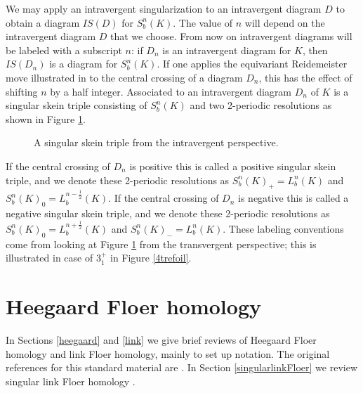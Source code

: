 \documentclass[11pt]{amsart}
\theoremstyle{definition}
\theoremstyle{remark}
\numberwithin{equation}{section}
\begin{document}
We may apply an intravergent singularization to an intravergent diagram $D$ to obtain a diagram $IS(D)$ for $S_b^n(K)$. The value of $n$ will depend on the intravergent diagram $D$ that we choose. From now on intravergent diagrams will be labeled with a subscript $n$: if $D_n$ is an intravergent diagram for $K$, then $IS(D_n)$ is a diagram for $S^n_b(K)$. If one applies the equivariant Reidemeister move illustrated in \cite[~Figure 4.1]{KhSI} to the central crossing of a  diagram $D_n$, this has the effect of shifting $n$ by a half integer.
Associated to an intravergent diagram $D_n$ of $K$ is a singular skein triple consisting of $S^n_b(K)$ and two 2-periodic resolutions as shown in Figure \ref{fig:singskeintripintra}. 
\begin{figure}[htb!]
\center
{}
\caption{A singular skein triple from the intravergent perspective.}\label{fig:singskeintripintra}\end{figure}
If the central crossing of $D_n$ is positive this is called a positive singular skein triple, and we denote these 2-periodic resolutions as $S_b^n(K)_+=L_b^n(K)$ and $S_b^n(K)_0=L_b^{n-\frac{1}{2}}(K)$.
If the central crossing of $D_n$ is negative this is called a negative singular skein triple, and we denote these 2-periodic resolutions as $S_b^n(K)_0=L_b^{n+\frac{1}{2}}(K)$ and $S_b^n(K)_-=L_b^n(K)$. These labeling conventions come from looking at Figure \ref{fig:singskeintripintra} from the transvergent perspective; this is illustrated in case of $3_1^+$ in Figure \ref{4trefoil}.\nopagebreak\section{Heegaard Floer homology}\label{HFsection}
In Sections \ref{heegaard} and \ref{link} we give brief reviews of Heegaard Floer homology and link Floer homology, mainly to set up notation. The original references for this standard material are \cite{OS3manifolds1, OSknots, OSlink, RasmussenThesis}. In Section \ref{singularlinkFloer} we review singular link Floer homology \cite{OSsing1,OSsing2}.
\end{document}
